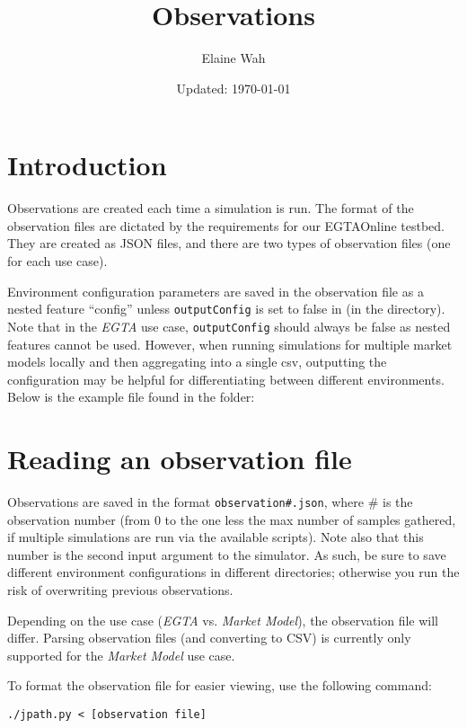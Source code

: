 \documentclass[11pt]{article}
\title{Observations}
\author{
  Elaine Wah\\
  \email{ewah@umich.edu}
}
\date{Updated: \today}
\begin{document}
	
\maketitle

\section{Introduction}

Observations are created each time a simulation is run.
The format of the observation files are dictated by the requirements for our EGTAOnline testbed. They are created as JSON files, and there are two types of observation files (one for each use case).

Environment configuration parameters are saved in the observation file as a nested feature ``config'' unless \verb|outputConfig| is set to false in  (in the  directory).
Note that in the \emph{EGTA} use case, \verb|outputConfig| should always be false as nested features cannot be used. However, when running simulations for multiple market models locally and then aggregating into a single csv, outputting the configuration may be helpful for differentiating between different environments.
%
Below is the example  file found in
the  folder:




\section{Reading an observation file}

Observations are saved in the format \verb|observation#.json|, where \# is the observation number (from 0 to the one less the max number of samples gathered, if multiple simulations are run via the available scripts). Note also that this number is the second input argument to the simulator.
As such, be sure to save different environment configurations in different directories; otherwise you run the risk of overwriting previous observations.

Depending on the use case (\emph{EGTA} vs. \emph{Market Model}), the observation file will differ. Parsing observation files (and converting to CSV) is currently only supported for the \emph{Market Model} use case.

To format the observation file for easier viewing, use the following command:
\begin{verbatim}
./jpath.py < [observation file]
\end{verbatim}
\end{document}

